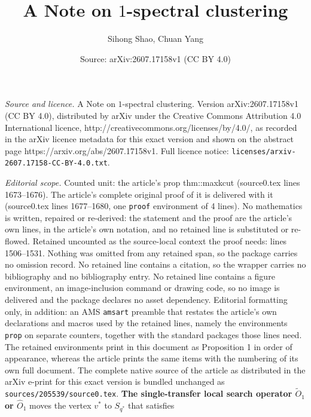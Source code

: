 \documentclass[10pt,a4paper]{amsart}
\title{A Note on $1$-spectral clustering}
\author{Sihong Shao, Chuan Yang}
\date{Source: arXiv:2607.17158v1 (CC BY 4.0)}
\begin{document}
\maketitle

\noindent\emph{Source and licence.} A Note on $1$-spectral clustering. Version arXiv:2607.17158v1 (CC BY 4.0), distributed by arXiv under the Creative Commons Attribution 4.0 International licence, http://creativecommons.org/licenses/by/4.0/, as recorded in the arXiv licence metadata for this exact version and shown on the abstract page https://arxiv.org/abs/2607.17158v1. Full licence notice: \texttt{licenses/arxiv-2607.17158-CC-BY-4.0.txt}.\par\smallskip

\noindent\textit{Editorial scope.} Counted unit: the article's prop thm::maxkcut (source0.tex lines 1673--1676). The article's complete original proof of it is delivered with it (source0.tex lines 1677--1680, one \texttt{proof} environment of 4 lines). No mathematics is written, repaired or re-derived: the statement and the proof are the article's own lines, in the article's own notation, and no retained line is substituted or re-flowed.  Retained uncounted as the source-local context the proof needs: lines 1506--1531.  Nothing was omitted from any retained span, so the package carries no omission record.  No retained line contains a citation, so the wrapper carries no bibliography and no bibliography entry.  No retained line contains a figure environment, an image-inclusion command or drawing code, so no image is delivered and the package declares no asset dependency.  Editorial formatting only, in addition: an AMS \texttt{amsart} preamble that restates the article's own declarations and macros used by the retained lines, namely the environments \texttt{prop} on separate counters, together with the standard packages those lines need.  The retained environments print in this document as Proposition 1 in order of appearance, whereas the article prints the same items with the numbering of its own full document.  The complete native source of the article as distributed in the arXiv e-print for this exact version is bundled unchanged as \texttt{sources/205539/source0.tex}.
			\textbf{The single-transfer local search operator $\widetilde{O}_1$ or $\widehat{O}_1$}  moves the vertex ${v}^*$ to $S_{{q}^*}$ that satisfies
\end{document}
